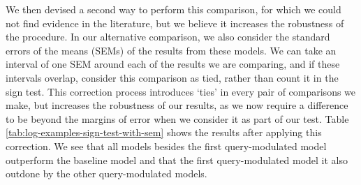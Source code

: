 We then devised a second way to perform this comparison, for which we could not find evidence in the literature, but we believe it increases the robustness of the procedure. In our alternative comparison, we also consider the standard errors of the means (SEMs) of the results from these models. We can take an interval of one SEM around each of the results we are comparing, and if these intervals overlap, consider this comparison as tied, rather than count it in the sign test. This correction process introduces ‘ties’ in every pair of comparisons we make, but increases the robustness of our results, as we now require a difference to be beyond the margins of error when we consider it as part of our test. Table \ref{tab:log-examples-sign-test-with-sem} shows the results after applying this correction. We see that all models besides the first query-modulated model outperform the baseline model and that the first query-modulated model it also outdone by the other query-modulated models.

